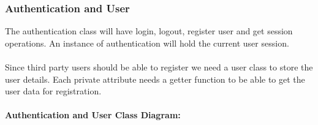 \subsubsection{Authentication and User}
The authentication class will have login, logout, register user and get session operations. An instance of authentication will hold the current user session.\\ \\
Since third party users should be able to register we need a user class to store the user details. Each private attribute needs a getter function to be able to get the user data for registration.\\ \\
\textbf{Authentication and User Class Diagram:}\\
\centerline{}
